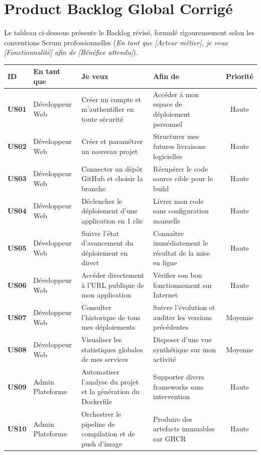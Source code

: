 \documentclass[12pt,a4paper,oneside]{report}
\begin{document}
\section{Product Backlog Global Corrigé}
Le tableau ci-dessous présente le Backlog révisé, formulé rigoureusement selon les conventions Scrum professionnelles (\textit{En tant que [Acteur métier], je veux [Fonctionnalité] afin de [Bénéfice attendu]}).

\begin{table}[H]
\centering
\scriptsize
\begin{tabularx}{\textwidth}{l p{2.8cm} X X c}
\toprule
\textbf{ID} & \textbf{En tant que} & \textbf{Je veux} & \textbf{Afin de} & \textbf{Priorité} \\
\midrule
\textbf{US01} & Développeur Web & Créer un compte et m'authentifier en toute sécurité & Accéder à mon espace de déploiement personnel & Haute \\
\textbf{US02} & Développeur Web & Créer et paramétrer un nouveau projet & Structurer mes futures livraisons logicielles & Haute \\
\textbf{US03} & Développeur Web & Connecter un dépôt GitHub et choisir la branche & Récupérer le code source cible pour le build & Haute \\
\textbf{US04} & Développeur Web & Déclencher le déploiement d'une application en 1 clic & Livrer mon code sans configuration manuelle & Haute \\
\textbf{US05} & Développeur Web & Suivre l'état d'avancement du déploiement en direct & Connaître immédiatement le résultat de la mise en ligne & Haute \\
\textbf{US06} & Développeur Web & Accéder directement à l'URL publique de mon application & Vérifier son bon fonctionnement sur Internet & Haute \\
\textbf{US07} & Développeur Web & Consulter l'historique de tous mes déploiements & Suivre l'évolution et auditer les versions précédentes & Moyenne \\
\textbf{US08} & Développeur Web & Visualiser les statistiques globales de mes services & Disposer d'une vue synthétique sur mon activité & Moyenne \\
\midrule
\textbf{US09} & Admin Plateforme & Automatiser l'analyse du projet et la génération du Dockerfile & Supporter divers frameworks sans intervention & Haute \\
\textbf{US10} & Admin Plateforme & Orchestrer le pipeline de compilation et de push d'image & Produire des artefacts immuables sur GHCR & Haute \\

\end{tabularx}
\end{table}
\end{document}
